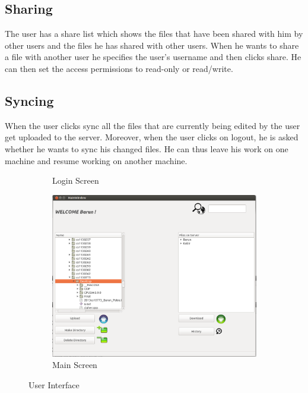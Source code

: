 \documentclass[]{article}
\begin{document}
\subsection{Sharing}The user has a share list which shows the files that have been shared with him by other users and the files he has shared with other users. When he wants to share a file with another user he specifies the user's username and then clicks share. He can then set the access permissions to read-only or read/write.
\subsection{Syncing}When the user clicks sync all the files that are currently being edited by the user get uploaded to the server. Moreover, when the user clicks on logout, he is asked whether he wants to sync his changed files. He can thus leave his work on one machine and resume working on another machine.
\begin{figure}
\hspace*{-1.2in}
\begin{subfigure}{.5\textwidth}
 \noindent{}
  \caption{Login Screen}
  \label{fig:sub1}
\end{subfigure}%
\begin{subfigure}{.5\textwidth}
  \centering
  \includegraphics[width=1.8\linewidth]{screen.png}
  \caption{Main Screen}
  \label{fig:sub2}
\end{subfigure}
\caption{User Interface}
\label{fig:test}
\end{figure}
\end{document}
